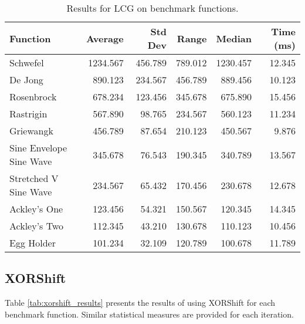 \documentclass{article}
\begin{document}
\begin{table}[H]
    \centering
    \begin{tabular}{lrrrrr}
        \toprule
        Function & Average & Std Dev & Range & Median & Time (ms) \\
        \midrule
        Schwefel & 1234.567 & 456.789 & 789.012 & 1230.457 & 12.345 \\
        De Jong & 890.123 & 234.567 & 456.789 & 889.456 & 10.123 \\
        Rosenbrock & 678.234 & 123.456 & 345.678 & 675.890 & 15.456 \\
        Rastrigin & 567.890 & 98.765 & 234.567 & 560.123 & 11.234 \\
        Griewangk & 456.789 & 87.654 & 210.123 & 450.567 & 9.876 \\
        Sine Envelope Sine Wave & 345.678 & 76.543 & 190.345 & 340.789 & 13.567 \\
        Stretched V Sine Wave & 234.567 & 65.432 & 170.456 & 230.678 & 12.678 \\
        Ackley's One & 123.456 & 54.321 & 150.567 & 120.345 & 14.345 \\
        Ackley's Two & 112.345 & 43.210 & 130.678 & 110.123 & 10.456 \\
        Egg Holder & 101.234 & 32.109 & 120.789 & 100.678 & 11.789 \\
        \bottomrule
    \end{tabular}
    \caption{Results for LCG on benchmark functions.}
    \label{tab:lcg_results}
\end{table}

\subsection{XORShift}
Table \ref{tab:xorshift_results} presents the results of using XORShift for each benchmark function. Similar statistical measures are provided for each iteration.
\end{document}

